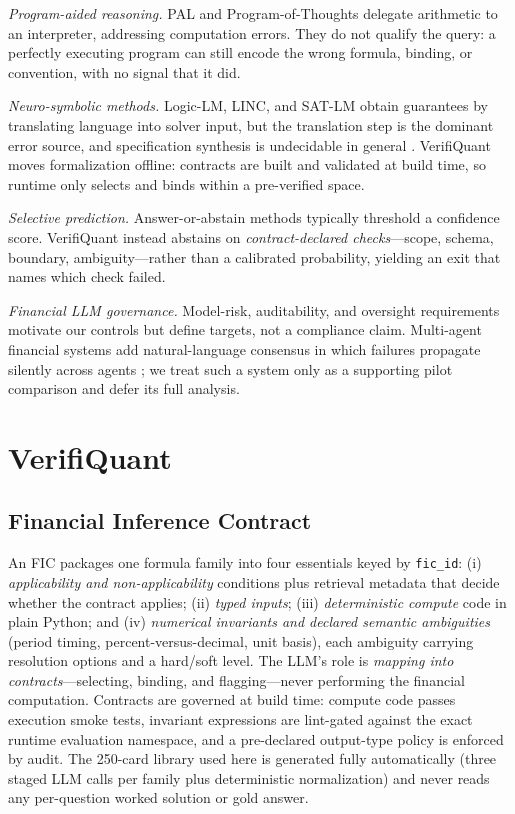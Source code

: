 \emph{Program-aided reasoning.}
PAL and Program-of-Thoughts \cite{gao2023pal,chen2023pot} delegate arithmetic to an interpreter, addressing computation errors.
They do not qualify the query: a perfectly executing program can still encode the wrong formula, binding, or convention, with no signal that it did.

\emph{Neuro-symbolic methods.}
Logic-LM, LINC, and SAT-LM \cite{pan2023logiclm,olausson2023linc,ye2023satlm} obtain guarantees by translating language into solver input, but the translation step is the dominant error source, and specification synthesis is undecidable in general \cite{zhou2026formaljudge}.
VerifiQuant moves formalization offline: contracts are built and validated at build time, so runtime only selects and binds within a pre-verified space.

\emph{Selective prediction.}
Answer-or-abstain methods \cite{elyaniv2010foundations,geifman2017selective} typically threshold a confidence score.
VerifiQuant instead abstains on \emph{contract-declared checks}---scope, schema, boundary, ambiguity---rather than a calibrated probability, yielding an exit that names which check failed.

\emph{Financial LLM governance.}
Model-risk, auditability, and oversight requirements \cite{fed2011sr117,euaiact2024,finra2020ai} motivate our controls but define targets, not a compliance claim.
Multi-agent financial systems \cite{kundu2025multiagent} add natural-language consensus in which failures propagate silently across agents \cite{cemri2025mas}; we treat such a system only as a supporting pilot comparison and defer its full analysis.

\section{VerifiQuant}\label{sec:v2method}
\subsection{Financial Inference Contract}
An FIC packages one formula family into four essentials keyed by \texttt{fic\_id}: (i) \emph{applicability and non-applicability} conditions plus retrieval metadata that decide whether the contract applies; (ii) \emph{typed inputs}; (iii) \emph{deterministic compute} code in plain Python; and (iv) \emph{numerical invariants and declared semantic ambiguities} (period timing, percent-versus-decimal, unit basis), each ambiguity carrying resolution options and a hard/soft level.
The LLM's role is \emph{mapping into contracts}---selecting, binding, and flagging---never performing the financial computation.
Contracts are governed at build time: compute code passes execution smoke tests, invariant expressions are lint-gated against the exact runtime evaluation namespace, and a pre-declared output-type policy is enforced by audit.
The 250-card library used here is generated fully automatically (three staged LLM calls per family plus deterministic normalization) and never reads any per-question worked solution or gold answer.

